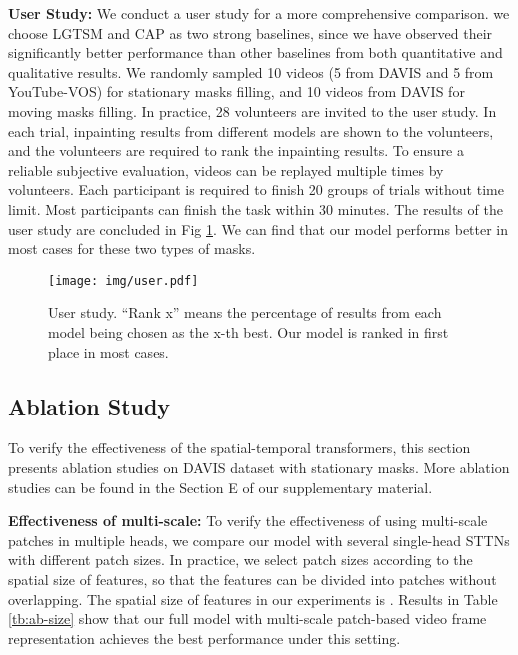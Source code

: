\documentclass[runningheads]{llncs}
\begin{document}
\textbf{User Study:} 
We conduct a user study for a more comprehensive comparison. 
we choose LGTSM \cite{chang2019learnable} and CAP \cite{lee2019copy} as two strong baselines, since we have observed their significantly better performance than other baselines from both quantitative and qualitative results. 
We randomly sampled 10 videos (5 from DAVIS and 5 from YouTube-VOS) for stationary masks filling, and 10 videos from DAVIS for moving masks filling. In practice, 28 volunteers are invited to the user study. In each trial, inpainting results from different models are shown to the volunteers, and the volunteers are required to rank the inpainting results. 
To ensure a reliable subjective evaluation, videos can be replayed multiple times by volunteers. Each participant is required to finish 20 groups of trials without time limit. 
Most participants can finish the task within 30 minutes. 
The results of the user study are concluded in Fig \ref{fig:user}. We can find that our model performs better in most cases for these two types of masks. 

\begin{figure}
   \begin{center}
      \texttt{[image: img/user.pdf]}
   \end{center}
   \caption{User study. ``Rank x'' means the percentage of results from each model being chosen as the x-th best. Our model is ranked in first place in most cases.}
   \label{fig:user}
\end{figure}


\subsection{Ablation Study}
\label{subsec:ab}
To verify the effectiveness of the spatial-temporal transformers, this section presents ablation studies on DAVIS dataset \cite{caelles20182018} with stationary masks. 
More ablation studies can be found in the Section E of our supplementary material.

\textbf{Effectiveness of multi-scale:} 
To verify the effectiveness of using multi-scale patches in multiple heads, we compare our model with several single-head STTNs with different patch sizes. 
In practice, we select patch sizes according to the spatial size of features, so that the features can be divided into patches without overlapping. 
The spatial size of features in our experiments is .
Results in Table \ref{tb:ab-size} show that our full model with multi-scale patch-based video frame representation achieves the best performance under this setting. 
\end{document}

